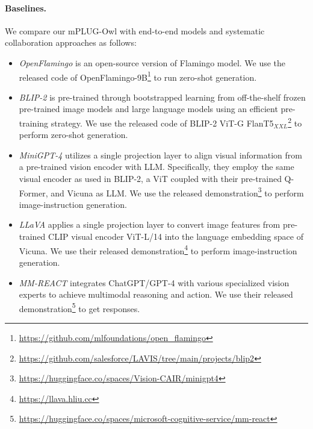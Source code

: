 \documentclass{article}
\newcommand{\modelname}{mPLUG-Owl\xspace}
\begin{document}
\paragraph{Baselines.} 
We compare our \modelname with end-to-end models and systematic collaboration approaches as follows:
\begin{itemize}
    \item \textit{OpenFlamingo} \citep{openflamingo} is an open-source version of Flamingo \citep{flamingo} model. We use the released code of OpenFlamingo-9B\footnote{\href{https://github.com/mlfoundations/open_flamingo}{https://github.com/mlfoundations/open\_flamingo}} to run zero-shot generation.
    \item \textit{BLIP-2} \citep{blip2} is pre-trained through bootstrapped learning from off-the-shelf frozen pre-trained image models and large language models using an efficient pre-training strategy. We use the released code of BLIP-2 ViT-G FlanT5$_{XXL}$\footnote{\href{https://github.com/salesforce/LAVIS/tree/main/projects/blip2}{https://github.com/salesforce/LAVIS/tree/main/projects/blip2}} to perform zero-shot generation.
    \item \textit{MiniGPT-4} \citep{minigpt4} utilizes a single projection layer to align visual information from a pre-trained vision encoder with LLM. Specifically, they employ the same visual encoder as used in BLIP-2, a ViT coupled with their pre-trained Q-Former, and Vicuna as LLM.
    We use the released demonstration\footnote{\href{https://huggingface.co/spaces/Vision-CAIR/minigpt4}{https://huggingface.co/spaces/Vision-CAIR/minigpt4}} to perform image-instruction generation.
    \item \textit{LLaVA} \citep{llava} applies a single projection layer to convert image features from pre-trained CLIP visual encoder ViT-L/14 into the language embedding space of Vicuna. We use their released demonstration\footnote{\href{https://llava.hliu.cc}{https://llava.hliu.cc}} to perform image-instruction generation.
    \item \textit{MM-REACT} \citep{mmreact} integrates ChatGPT/GPT-4 with various specialized vision experts to achieve multimodal reasoning and action. We use their released demonstration\footnote{\href{https://huggingface.co/spaces/microsoft-cognitive-service/mm-react}{https://huggingface.co/spaces/microsoft-cognitive-service/mm-react}} to get responses. 
\end{itemize}
\end{document}
